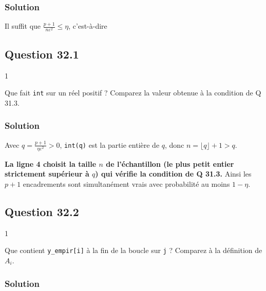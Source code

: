 \documentclass[11pt,a4paper]{article}
\newcommand{\equationajustee}[1]{%
  \sbox{\boiteequation}{$\displaystyle #1$}%
  \ifdim\wd\boiteequation>\linewidth
    \[\resizebox{\linewidth}{!}{\usebox{\boiteequation}}\]%
  \else
    \[#1\]%
  \fi}
\begin{document}
\hypertarget{solution-75}{%
\subsubsection{Solution}\label{solution-75}}

Il suffit que \(\frac{p+1}{n\varepsilon^2}\le\eta\), c'est-à-dire

\equationajustee{\boxed{n\ge\frac{p+1}{\eta\,\varepsilon^2}}}

\hypertarget{question-32.1}{%
\subsection{Question 32.1}\label{question-32.1}}

\begin{indication}{1}

Que fait \texttt{int} sur un réel positif ? Comparez la valeur obtenue à la condition de Q 31.3.

\end{indication}

\hypertarget{solution-76}{%
\subsubsection{Solution}\label{solution-76}}

Avec \(q=\frac{p+1}{\eta\varepsilon^2}>0\), \texttt{int(q)} est la partie entière de \(q\), donc \(n=\lfloor q\rfloor+1>q\).

\textbf{La ligne 4 choisit la taille \(n\) de l'échantillon (le plus petit entier strictement supérieur à \(q\)) qui vérifie la condition de Q 31.3.} Ainsi les \(p+1\) encadrements sont simultanément vrais avec probabilité au moins \(1-\eta\).

\hypertarget{question-32.2}{%
\subsection{Question 32.2}\label{question-32.2}}

\begin{indication}{1}

Que contient \texttt{y\_empir{[}i{]}} à la fin de la boucle sur \texttt{j} ? Comparez à la définition de \(A_i\).

\end{indication}

\hypertarget{solution-77}{%
\subsubsection{Solution}\label{solution-77}}
\end{document}
